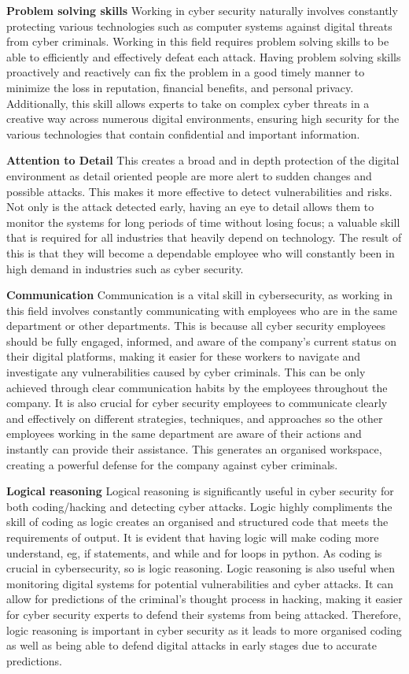 \documentclass[a4paper, 11pt]{report}
\begin{document}
\textbf{Problem solving skills}
Working in cyber security naturally involves constantly protecting various technologies such as computer systems against digital threats from cyber criminals. Working in this field requires problem solving skills to be able to efficiently and effectively defeat each attack. Having problem solving skills proactively and reactively can fix the problem in a good timely manner to minimize the loss in reputation, financial benefits, and personal privacy. Additionally, this skill allows experts to take on complex cyber threats in a creative way across numerous digital environments, ensuring high security for the various technologies that contain confidential and important information. 

\textbf{Attention to Detail}
This creates a broad and in depth protection of the digital environment as detail oriented people are more alert to sudden changes and possible attacks. This  makes it more effective to detect vulnerabilities and risks. Not only is the attack detected early, having an eye to detail allows them to monitor the systems for long periods of time without losing focus; a valuable skill that is required for all industries that heavily depend on technology. The result of this is that they will become a dependable employee who will constantly been in high demand in industries such as cyber security. 

\textbf{Communication}
Communication is a vital skill in cybersecurity, as working in this field involves constantly communicating with employees who are in the same department or other departments. This is because all cyber security employees should be fully engaged, informed, and aware of the company's current status on their digital platforms, making it easier for these workers to navigate and investigate any vulnerabilities caused by cyber criminals. This can be only achieved through clear communication habits by the employees throughout the company. It is also crucial for cyber security employees to communicate clearly and effectively on different strategies, techniques, and approaches so the other employees working in the same department are aware of their actions and instantly can provide their assistance. This generates an organised workspace, creating a powerful defense for the company against cyber criminals. 

\textbf{Logical reasoning}
Logical reasoning is significantly useful in cyber security for both coding/hacking and detecting cyber attacks. Logic highly compliments the skill of coding as logic creates an organised and structured code that meets the requirements of output. It is evident that having logic will make coding more understand, eg, if statements, and while and for loops in python. As coding is crucial in cybersecurity, so is logic reasoning. Logic reasoning is also useful when monitoring digital systems for potential vulnerabilities and cyber attacks. It can allow for predictions of the criminal’s thought process in hacking, making it easier for cyber security experts to defend their systems from being attacked. Therefore, logic reasoning is important in cyber security as it leads to more organised coding as well as being able to defend digital attacks in early stages due to accurate predictions.
\end{document}
